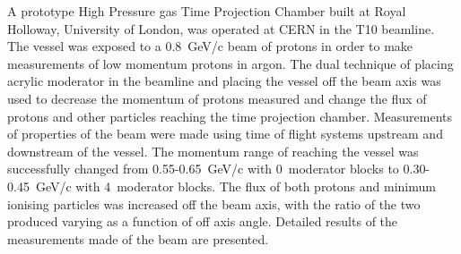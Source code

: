 A prototype High Pressure gas Time Projection Chamber built at Royal Holloway, University of London, was operated at CERN in the T10 beamline. The vessel was exposed to a 0.8~GeV/c beam of protons in order to make measurements of low momentum protons in argon. The dual technique of placing acrylic moderator in the beamline and placing the vessel off the beam axis was used to decrease the momentum of protons measured and change the flux of protons and other particles reaching the time projection chamber. Measurements of properties of the beam were made using time of flight systems upstream and downstream of the vessel. The momentum range of reaching the vessel was successfully changed from 0.55-0.65~GeV/c with 0~moderator blocks to 0.30-0.45~GeV/c with 4~moderator blocks. The flux of both protons and minimum ionising particles was increased off the beam axis, with the ratio of the two produced varying as a function of off axis angle. Detailed results of the measurements made of the beam are presented.

